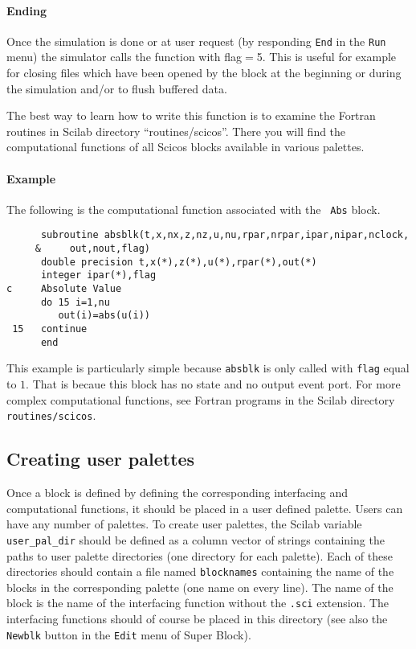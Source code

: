 \paragraph{Ending} Once the simulation is done or at user request
(by responding {\tt End} in the {\tt Run} menu) the simulator calls
the function with flag$=$5. This is useful for example for closing files
which have been opened by the block at the beginning or during the
simulation and/or to flush buffered data.

The best way to learn how to write this function is to examine the
Fortran routines in Scilab directory ``routines/scicos''. There you
will find the computational functions of all Scicos   blocks available
in various palettes.

\paragraph{Example}
The following is the computational function associated with the {\tt
Abs} block.

\begin{verbatim}
      subroutine absblk(t,x,nx,z,nz,u,nu,rpar,nrpar,ipar,nipar,nclock,
     &     out,nout,flag)
      double precision t,x(*),z(*),u(*),rpar(*),out(*)
      integer ipar(*),flag
c     Absolute Value
      do 15 i=1,nu
         out(i)=abs(u(i))
 15   continue
      end
\end{verbatim}
 
This example is particularly simple because {\tt absblk} is only
called with {\tt flag} equal to $1$. That is becaue this block has no
state and no output event port. For more complex computational
functions, see Fortran programs in the Scilab directory {\tt
routines/scicos}.

\subsection{Creating user palettes}
Once a block is defined by defining the corresponding interfacing and 
computational functions, it should be placed in a user defined palette.
Users can have any number of palettes.  To create user palettes, the Scilab
variable {\tt user\_pal\_dir} should be defined
as a column vector of strings containing the
paths to user palette directories (one directory for each palette). Each
of these directories should contain a file named {\tt blocknames} containing
the name of the blocks in the corresponding palette (one name on every line).
The name of the block is the name of the interfacing function without the
{\tt .sci} extension. The interfacing functions should of course be placed in
this directory (see also the {\tt Newblk} button in the {\tt Edit} menu of 
Super Block).

